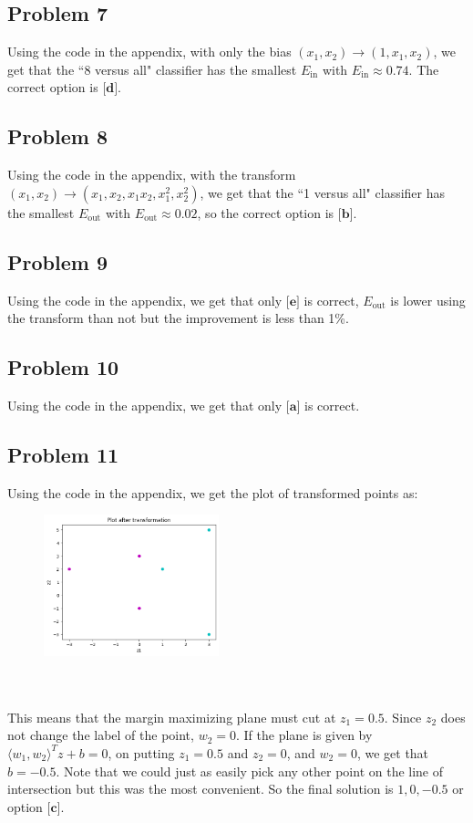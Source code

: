 \documentclass{article}
\begin{document}
\subsection*{Problem 7}
Using the code in the appendix, with only the bias $(x_{1}, x_{2}) \to (1, x_1, x_2)$, we get that the ``8 versus all" classifier has the smallest $E_{\text{in}}$ with $E_{\text{in}} \approx 0.74$. The correct option is $\textbf{[d]}$.
\subsection*{Problem 8}
Using the code in the appendix, with the transform $(x_1, x_2) \to (x_1, x_2, x_1 x_2, x_{1}^{2}, x_{2}^2)$, we get that the ``1 versus all" classifier has the smallest $E_{\text{out}}$ with $E_{\text{out}} \approx 0.02$, so the correct option is $\textbf{[b]}$.
\subsection*{Problem 9}
Using the code in the appendix, we get that only $\textbf{[e]}$ is correct, $E_{\text{out}}$ is lower using the transform than not but the improvement is less than 1\%. 
\subsection*{Problem 10}
Using the code in the appendix, we get that only $\textbf{[a]}$ is correct.
\subsection*{Problem 11}
Using the code in the appendix, we get the plot of transformed points as:
\begin{figure}[htp]
    \centering
    \includegraphics[width=2in]{plotfinal.png}
    \label{fig:galaxy}
\end{figure}
\\\\This means that the margin maximizing plane must cut at $z_1 = 0.5$. Since $z_2$ does not change the label of the point, $w_2 = 0$. If the plane is given by $\langle w_1, w_2 \rangle^{T}z + b = 0$, on putting $z_1 = 0.5$ and $z_2 = 0$, and $w_2 = 0$, we get that $b = -0.5$. Note that we could just as easily pick any other point on the line of intersection but this was the most convenient. So the final solution is $1, 0, -0.5$ or option $\textbf{[c]}$.
\end{document}
